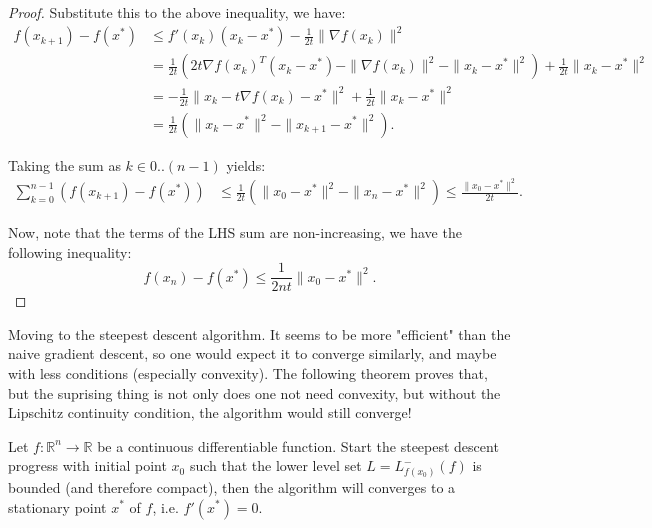 \begin{proof}
  Substitute this to the above inequality, we have:
  \begin{align*}
    f(x_{k+1}) - f(x^{*}) &\le f'(x_{k})(x_{k}-x^{*}) - \frac{1}{2t}\|\nabla
    f(x_{k})\|^2\\
    &= \frac{1}{2t} \left( 2t \nabla f(x_{k})^{T}(x_{k}-x^{*}) - \|\nabla
    f(x_{k})\|^2 - \|x_{k} - x^{*}\|^2 \right)  + \frac{1}{2t}\|x_{k}-x^{*}\|^2\\
    &= -\frac{1}{2t}\|x_{k} - t\nabla f(x_{k}) - x^{*}\|^2 +
    \frac{1}{2t}\|x_{k}-x^{*}\|^2\\
    &= \frac{1}{2t}\left( \|x_{k}-x^{*}\|^2 - \|x_{k+1}-x^{*}\|^2 \right) 
  .\end{align*}

  Taking the sum as \( k \in 0..(n - 1) \) yields:
  \begin{align*}
    \sum_{k=0}^{n-1} \left( f(x_{k+1}) - f(x^{*}) \right) &\le \frac{1}{2t}
    \left( \|x_{0}-x^{*}\|^2 - \|x_{n}-x^{*}\|^2 \right) \le
    \frac{\|x_{0}-x^{*}\|^2}{2t}
  .\end{align*}

  Now, note that the terms of the LHS sum are non-increasing, we have the following
  inequality:
  \[
    f(x_{n}) - f(x^{*}) \le \frac{1}{2nt}\|x_{0}-x^{*}\|^2
  .\] 
\end{proof}

Moving to the steepest descent algorithm. It seems to be more "efficient" than
the naive gradient descent, so one would expect it to converge similarly, and
maybe with less conditions (especially convexity). The following theorem proves
that, but the suprising thing is not only does one not need convexity, but
without the Lipschitz continuity condition, the algorithm would still converge!

\begin{theorem}
\label{thr:Global Convergence of Steepest Descent}
  Let \( f: \mathbb{R}^{n} \to \mathbb{R} \) be a continuous differentiable
  function. Start the steepest descent progress with initial point \( x_{0} \)
  such that the lower level set \( L = L_{f(x_{0})}^{-}(f) \) is bounded (and
  therefore compact), then the algorithm will converges to a stationary point \(
  x^{*} \) of \( f \), i.e. \( f'(x^{*}) = 0 \).
\end{theorem}

